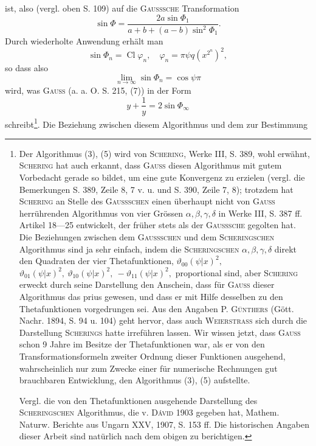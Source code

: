 ist, also (vergl. oben S. 109) auf die \textsc{Gausssche} Transformation
\[
\sin\Phi=\frac{2a\sin\Phi_1}{a+b+(a-b)\sin^2\Phi_1}.
\]
\HistoricalFoot{}{17\textsuperscript{*}}
\clearpage{}
\noindent Durch wiederholte Anwendung erhält man
\[
\sin\Phi_n=\operatorname{Cl}\varphi_n,\quad\varphi_n=\pi\psi q(x^{2^n})^2,
\]
so dass also
\begingroup\makeatletter\tagsleft@true\let\veqno\leqno\makeatother
\begin{equation*}
\lim_{n\to\infty}\sin\Phi_n=\cos\psi\pi\tag{9}
\end{equation*}\endgroup
\noindent wird, was \textsc{Gauss} (a. a. O. S. 215, (7)) in der Form
\[
y+\frac{1}{y}=2\sin\Phi_\infty
\]
schreibt\footnote{Der Algorithmus (3), (5) wird von \textsc{Schering}, Werke III, S. 389, wohl erwähnt, \textsc{Schering} hat auch erkannt, dass \textsc{Gauss} diesen Algorithmus mit gutem Vorbedacht gerade so bildet, um eine gute Konvergenz zu erzielen (vergl. die Bemerkungen S. 389, Zeile 8, 7 v. u. und S. 390, Zeile 7, 8); trotzdem hat \textsc{Schering} an Stelle des \textsc{Gaussschen} einen überhaupt nicht von \textsc{Gauss} herrührenden Algorithmus von vier Grössen \(\alpha,\beta,\gamma,\delta\) in Werke III, S. 387 ff. Artikel 18—25 entwickelt, der früher stets als der \textsc{Gausssche} gegolten hat. Die Beziehungen zwischen dem \textsc{Gaussschen} und dem \textsc{Scheringschen} Algorithmus sind ja sehr einfach, indem die \textsc{Scheringschen} \(\alpha,\beta,\gamma,\delta\) direkt den Quadraten der vier Thetafunktionen, \(\vartheta_{00}(\psi|x)^2,\) \(\vartheta_{01}(\psi|x)^2,\ \vartheta_{10}(\psi|x)^2,\ -\vartheta_{11}(\psi|x)^2,\) proportional sind, aber \textsc{Schering} erweckt durch seine Darstellung den Anschein, dass für \textsc{Gauss} dieser Algorithmus das prius gewesen, und dass er mit Hilfe desselben zu den Thetafunktionen vorgedrungen sei. Aus den Angaben P. \textsc{Günthers} (Gött. Nachr. 1894, S. 94 u. 104) geht hervor, dass auch \textsc{Weierstrass} sich durch die Darstellung \textsc{Scherings} hatte irreführen lassen. Wir wissen jetzt, dass \textsc{Gauss} schon 9 Jahre im Besitze der Thetafunktionen war, als er von den Transformationsformeln zweiter Ordnung dieser Funktionen ausgehend, wahrscheinlich nur zum Zwecke einer für numerische Rechnungen gut brauchbaren Entwicklung, den Algorithmus (3), (5) aufstellte.\par
Vergl. die von den Thetafunktionen ausgehende Darstellung des \textsc{Scheringschen} Algorithmus, die v. \textsc{Dávid} 1903 gegeben hat, Mathem. Naturw. Berichte aus Ungarn XXV, 1907, S. 153 ff. Die historischen Angaben dieser Arbeit sind natürlich nach dem obigen zu berichtigen.}. Die Beziehung zwischen diesem Algorithmus und dem zur Bestimmung
